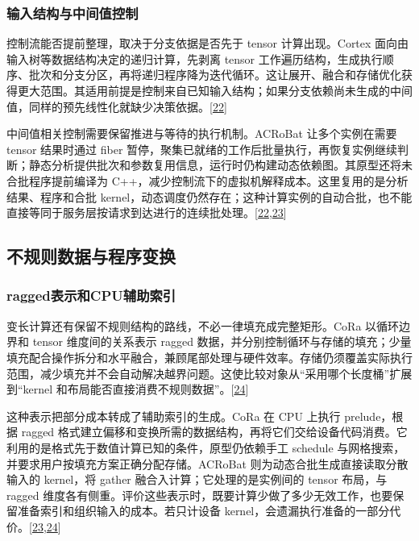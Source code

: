 \documentclass[
  UTF8,
  zihao=5]{ctexart}
\begin{document}
\hypertarget{ux8f93ux5165ux7ed3ux6784ux4e0eux4e2dux95f4ux503cux63a7ux5236}{%
\subsubsection{输入结构与中间值控制}\label{ux8f93ux5165ux7ed3ux6784ux4e0eux4e2dux95f4ux503cux63a7ux5236}}

控制流能否提前整理，取决于分支依据是否先于 tensor 计算出现。Cortex
面向由输入树等数据结构决定的递归计算，先剥离 tensor
工作遍历结构，生成执行顺序、批次和分支分区，再将递归程序降为迭代循环。这让展开、融合和存储优化获得更大范围。其适用前提是控制来自已知输入结构；如果分支依赖尚未生成的中间值，同样的预先线性化就缺少决策依据。{[}\protect\hyperlink{ref-fegade2021cortex}{22}{]}

中间值相关控制需要保留推进与等待的执行机制。ACRoBat 让多个实例在需要
tensor 结果时通过 fiber
暂停，聚集已就绪的工作后批量执行，再恢复实例继续判断；静态分析提供批次和参数复用信息，运行时仍构建动态依赖图。其原型还将未合批程序提前编译为
C++，减少控制流下的虚拟机解释成本。这里复用的是分析结果、程序和合批
kernel，动态调度仍然存在；这种计算实例的自动合批，也不能直接等同于服务层按请求到达进行的连续批处理。{[}\protect\hyperlink{ref-fegade2021cortex}{22},\protect\hyperlink{ref-fegade2024acrobat}{23}{]}

\hypertarget{ux4e0dux89c4ux5219ux6570ux636eux4e0eux7a0bux5e8fux53d8ux6362}{%
\subsection{不规则数据与程序变换}\label{ux4e0dux89c4ux5219ux6570ux636eux4e0eux7a0bux5e8fux53d8ux6362}}

\hypertarget{raggedux8868ux793aux548ccpuux8f85ux52a9ux7d22ux5f15}{%
\subsubsection{ragged表示和CPU辅助索引}\label{raggedux8868ux793aux548ccpuux8f85ux52a9ux7d22ux5f15}}

变长计算还有保留不规则结构的路线，不必一律填充成完整矩形。CoRa
以循环边界和 tensor 维度间的关系表示 ragged
数据，并分别控制循环与存储的填充；少量填充配合操作拆分和水平融合，兼顾尾部处理与硬件效率。存储仍须覆盖实际执行范围，减少填充并不会自动解决越界问题。这使比较对象从``采用哪个长度桶''扩展到``kernel
和布局能否直接消费不规则数据''。{[}\protect\hyperlink{ref-fegade2022cora}{24}{]}

这种表示把部分成本转成了辅助索引的生成。CoRa 在 CPU 上执行 prelude，根据
ragged
格式建立偏移和变换所需的数据结构，再将它们交给设备代码消费。它利用的是格式先于数值计算已知的条件，原型仍依赖手工
schedule 与网格搜索，并要求用户按填充方案正确分配存储。ACRoBat
则为动态合批生成直接读取分散输入的 kernel，将 gather
融合入计算；它处理的是实例间的 tensor 布局，与 ragged
维度各有侧重。评价这些表示时，既要计算少做了多少无效工作，也要保留准备索引和组织输入的成本。若只计设备
kernel，会遗漏执行准备的一部分代价。{[}\protect\hyperlink{ref-fegade2024acrobat}{23},\protect\hyperlink{ref-fegade2022cora}{24}{]}
\end{document}

